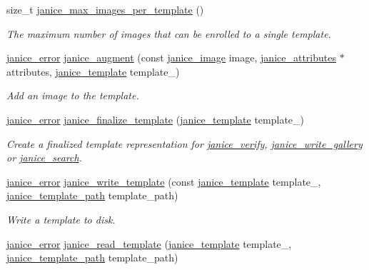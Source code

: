 \begin{DoxyCompactItemize}
size\+\_\+t \hyperlink{group__janice_ga1984d7dfbaab7010a9eaa1a2c21b3934}{janice\+\_\+max\+\_\+images\+\_\+per\+\_\+template} ()
\begin{DoxyCompactList}\small\item\em The maximum number of images that can be enrolled to a single template. \end{DoxyCompactList}\item 
\hyperlink{group__janice_ga4873d49c1f9d6a6880dfbd485cf6ba72}{janice\+\_\+error} \hyperlink{group__janice_gae05799e93603418e9f0df2ce4bda0301}{janice\+\_\+augment} (const \hyperlink{structjanice__image}{janice\+\_\+image} image, \hyperlink{structjanice__attributes}{janice\+\_\+attributes} $\ast$attributes, \hyperlink{group__janice_ga5593b06e86b90504968c0fc191ee2f3c}{janice\+\_\+template} template\+\_\+)
\begin{DoxyCompactList}\small\item\em Add an image to the template. \end{DoxyCompactList}\item 
\hyperlink{group__janice_ga4873d49c1f9d6a6880dfbd485cf6ba72}{janice\+\_\+error} \hyperlink{group__janice_gaf4894cf8cd61aa1ec60541f11cdb6de8}{janice\+\_\+finalize\+\_\+template} (\hyperlink{group__janice_ga5593b06e86b90504968c0fc191ee2f3c}{janice\+\_\+template} template\+\_\+)
\begin{DoxyCompactList}\small\item\em Create a finalized template representation for \hyperlink{group__janice_gafdbbe1f5e6346e5e84be26192e4561ac}{janice\+\_\+verify}, \hyperlink{group__janice_gaf6aa26be058ad0905d9a03d1798835be}{janice\+\_\+write\+\_\+gallery} or \hyperlink{group__janice_ga073aa5f2133223c0b31ac3e78671836a}{janice\+\_\+search}. \end{DoxyCompactList}\item 
\hyperlink{group__janice_ga4873d49c1f9d6a6880dfbd485cf6ba72}{janice\+\_\+error} \hyperlink{group__janice_ga0d4dbc4c5af8e9be07634e5da920f51b}{janice\+\_\+write\+\_\+template} (const \hyperlink{group__janice_ga5593b06e86b90504968c0fc191ee2f3c}{janice\+\_\+template} template\+\_\+, \hyperlink{group__janice_gafaa1c0182c7a56aaafea6e2bfe471cc8}{janice\+\_\+template\+\_\+path} template\+\_\+path)
\begin{DoxyCompactList}\small\item\em Write a template to disk. \end{DoxyCompactList}\item 
\hyperlink{group__janice_ga4873d49c1f9d6a6880dfbd485cf6ba72}{janice\+\_\+error} \hyperlink{group__janice_gace5b3f84daa9349c4557f4e0c8b23a13}{janice\+\_\+read\+\_\+template} (\hyperlink{group__janice_ga5593b06e86b90504968c0fc191ee2f3c}{janice\+\_\+template} template\+\_\+, \hyperlink{group__janice_gafaa1c0182c7a56aaafea6e2bfe471cc8}{janice\+\_\+template\+\_\+path} template\+\_\+path)

\end{DoxyCompactItemize}
